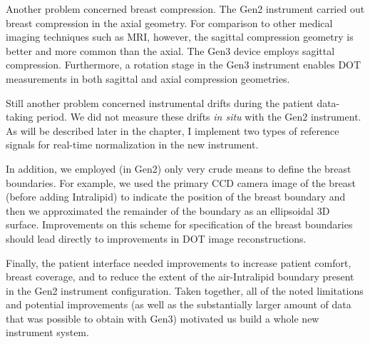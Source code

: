 Another problem concerned breast compression. The Gen2 instrument carried out breast compression in the axial geometry. For comparison to other medical imaging techniques such as MRI, however, the sagittal compression geometry is better and more common than the axial. The Gen3 device employs sagittal compression. Furthermore, a rotation stage in the Gen3 instrument enables DOT measurements in both sagittal and axial compression geometries. 

Still another problem concerned instrumental drifts during the patient data-taking period. We did not measure these drifts \textit{in situ}  with the Gen2 instrument. As will be described later in the chapter, I implement two types of reference signals for real-time normalization in the new instrument.

In addition, we employed (in Gen2) only very crude means to define the breast boundaries. For example, we used the primary CCD camera image of the breast (before adding Intralipid) to indicate the position of the breast boundary and then we approximated the remainder of the boundary as an ellipsoidal 3D surface. Improvements on this scheme for specification of the breast boundaries should lead directly to improvements in DOT image reconstructions. 

Finally, the patient interface needed improvements to increase patient comfort, breast coverage, and to reduce the extent of the air-Intralipid boundary present in the Gen2 instrument configuration. Taken together, all of the noted limitations and potential improvements (as well as the substantially larger amount of data that was possible to obtain with Gen3) motivated us build a whole new instrument system.

